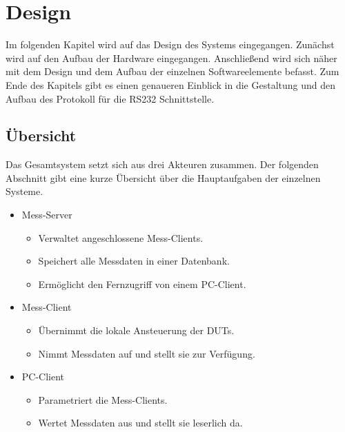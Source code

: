 \chapter{Design}
\label{chapter_Design}

Im folgenden Kapitel wird auf das Design des Systems eingegangen. Zunächst wird auf den Aufbau der Hardware eingegangen. Anschließend wird sich näher mit dem Design und dem Aufbau der einzelnen Softwareelemente befasst. Zum Ende des Kapitels gibt es einen genaueren Einblick in die Gestaltung und den Aufbau des Protokoll für die RS232 Schnittstelle.

\section{Übersicht}
\label{section_Teststand}

Das Gesamtsystem setzt sich aus drei Akteuren zusammen. Der folgenden Abschnitt gibt eine kurze Übersicht über die Hauptaufgaben der einzelnen Systeme.

\begin{itemize}

\item Mess-Server
\begin{itemize}
\item Verwaltet angeschlossene Mess-Clients.
\item Speichert alle Messdaten in einer Datenbank.
\item Ermöglicht den Fernzugriff von einem PC-Client.
\end{itemize}

\item Mess-Client
\begin{itemize}
\item Übernimmt die lokale Ansteuerung der \acp{DUT}.
\item Nimmt Messdaten auf und stellt sie zur Verfügung.
\end{itemize}

\item PC-Client
\begin{itemize}
\item Parametriert die Mess-Clients.
\item Wertet Messdaten aus und stellt sie leserlich da.
\end{itemize}

\end{itemize}


